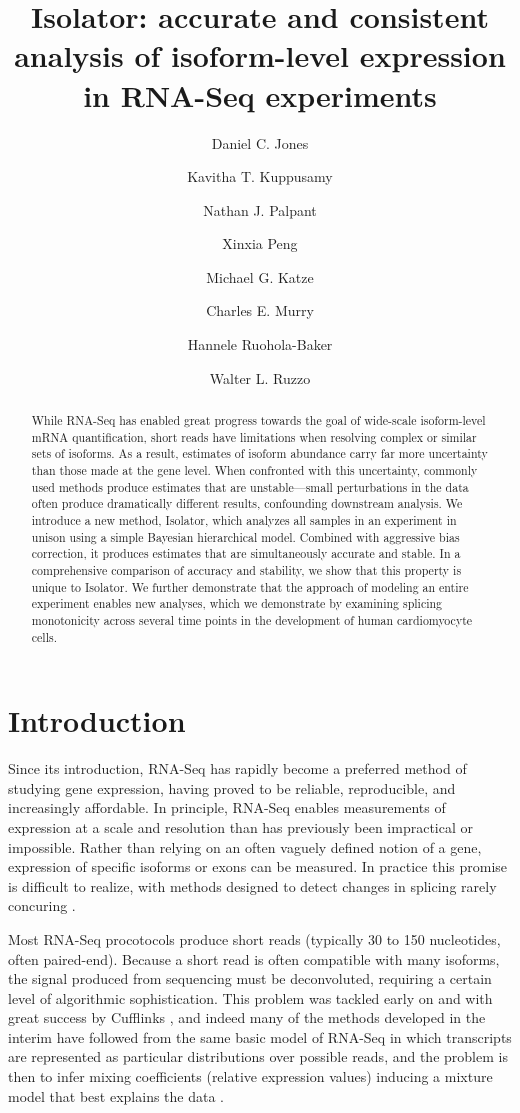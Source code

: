 \documentclass[twocolumn]{article}
\title{Isolator: accurate and consistent analysis of isoform-level expression in RNA-Seq experiments}
\author[1]{Daniel C. Jones}
\author[2]{Kavitha T. Kuppusamy}
\author[3]{Nathan J. Palpant}
\author[4]{Xinxia Peng}
\author[4]{Michael G. Katze}
\author[5]{Charles E. Murry}
\author[6]{Hannele Ruohola-Baker}
\author[1,7,8]{Walter L. Ruzzo}
\affil[1]{Department of Computer Science and Engineering, University of Washington}
\affil[2]{XXX}
\affil[3]{XXX}
\affil[4]{Department of Microbiology, University of Washington}
\affil[5]{Department of Pathology, University of Washington}
\affil[6]{Department of Biochemistry, University of Washington}
\affil[7]{Department of Genome Sciences, University of Washington}
\affil[8]{Fred Hutchinson Cancer Research Center}
\begin{document}
\maketitle

\begin{abstract}
    While RNA-Seq has enabled great progress towards the goal of wide-scale
    isoform-level mRNA quantification, short reads have limitations when
    resolving complex or similar sets of isoforms. As a result, estimates of
    isoform abundance carry far more uncertainty than those made at the gene
    level. When confronted with this uncertainty, commonly used methods produce
    estimates that are unstable---small perturbations in the data often produce
    dramatically different results, confounding downstream analysis. We
    introduce a new method, Isolator, which analyzes all samples in an
    experiment in unison using a simple Bayesian hierarchical model. Combined
    with aggressive bias correction, it produces estimates that are
    simultaneously accurate and stable. In a comprehensive comparison of
    accuracy and stability, we show that this property is unique to Isolator. We
    further demonstrate that the approach of modeling an entire experiment
    enables new analyses, which we demonstrate by examining splicing
    monotonicity across several time points in the development of human
    cardiomyocyte cells.
\end{abstract}


\section{Introduction}\label{introduction}

Since its introduction, RNA-Seq has rapidly become a preferred method of
studying gene expression, having proved to be reliable, reproducible, and
increasingly affordable. In principle, RNA-Seq enables measurements of
expression at a scale and resolution than has previously been impractical or
impossible. Rather than relying on an often vaguely defined notion of a gene,
expression of specific isoforms or exons can be measured. In practice this
promise is difficult to realize, with methods designed to detect changes in
splicing rarely concuring \cite{Liu:2014dn}.

Most RNA-Seq procotocols produce short reads (typically 30 to 150 nucleotides,
often paired-end).  Because a short read is often compatible with many isoforms,
the signal produced from sequencing must be deconvoluted, requiring a certain
level of algorithmic sophistication. This problem was tackled early on and with
great success by Cufflinks \cite{Trapnell:2010kd}, and indeed many of the
methods developed in the interim have followed from the same basic model of
RNA-Seq in which transcripts are represented as particular distributions over
possible reads, and the problem is then to infer mixing coefficients (relative
expression values) inducing a mixture model that best explains the data
\cite{Pachter:2011wm}.
\end{document}
